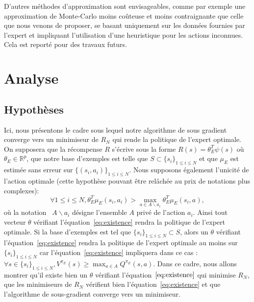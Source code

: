 \documentclass[publibook-draft]{CAp2012}
\begin{document}
D'autres méthodes d'approximation sont envisageables, comme par exemple une approximation de Monte-Carlo moins coûteuse et moins contraignante que celle que nous venons de proposer, se basant uniquement sur les données fournies par l'expert et impliquant l'utilisation d'une heuristique pour les actions inconnues. Cela est reporté pour des travaux futurs.
\section{Analyse}\label{proof.sec}
\subsection{Hypothèses}
Ici, nous présentons le cadre sous lequel notre algorithme de sous gradient converge vers un minimiseur de $R_N$ qui rende la politique de l'expert optimale. On supposera que la récompense $R$ s'écrive sous la forme $R(s)=\theta_E^T\psi(s)$ où $\theta_E\in\mathbb{R}^p$, que notre base d'exemples est telle que $S\subset \{s_i\}_{1\leq i \leq N}$ et que $\mu_E$ est estimée sans erreur sur $\{(s_i,a_i)\}_{1\leq i \leq N}$. Nous supposons également l'unicité de l'action optimale (cette hypothèse pouvant être relâchée au prix de notations plus complexes):
\begin{equation}\label{eq:existence}
\forall 1\leq i \leq N, \theta_E^T\mu_E(s_i,a_i)>\max_{a\in A \backslash a_i}\theta_E^T\mu_E(s_i,a),
\end{equation}
où la notation ~$A \backslash a_i$ désigne l'ensemble $A$ privé de l'action $a_i$. Ainsi tout vecteur $\theta$ vérifiant l'équation~\eqref{eq:existence} rendra la politique de l'expert optimale. Si la base d'exemples est tel que $\{s_i\}_{1\leq i \leq N}\subset S$, alors un $\theta$ vérifiant l'équation~\eqref{eq:existence} rendra la politique de l'expert optimale au moins sur $\{s_i\}_{1\leq i \leq N}$ car l'équation~\eqref{eq:existence} impliquera dans ce cas :$\forall s\in \{s_i\}_{1\leq i \leq N}, V^{\pi_E}(s)\geq\max_{a\in A}Q^{\pi_E}(s,a)$.
Dans ce cadre, nous allons montrer qu'il existe bien un $\theta$ vérifiant l'équation~$\eqref{eq:existence}$ qui minimise $R_N$,  que les minimiseurs de $R_N$ vérifient bien l'équation~\eqref{eq:existence} et que l'algorithme de sous-gradient converge vers un minimiseur.
\end{document}
